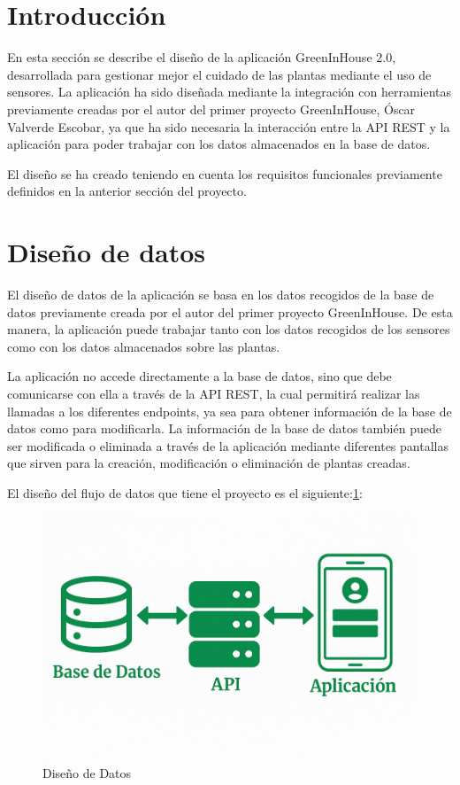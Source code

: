 
\section{Introducción}
En esta sección se describe el diseño de la aplicación GreenInHouse 2.0, desarrollada para gestionar mejor el cuidado de las plantas mediante el uso de sensores.
La aplicación ha sido diseñada mediante la integración con herramientas previamente creadas por el autor del primer proyecto GreenInHouse, Óscar Valverde Escobar, ya que ha sido necesaria la interacción entre la API REST y la aplicación para poder trabajar con los datos almacenados en la base de datos.

El diseño se ha creado teniendo en cuenta los requisitos funcionales previamente definidos en la anterior sección del proyecto.

\section{Diseño de datos}
El diseño de datos de la aplicación se basa en los datos recogidos de la base de datos previamente creada por el autor del primer proyecto GreenInHouse.
De esta manera, la aplicación puede trabajar tanto con los datos recogidos de los sensores como con los datos almacenados sobre las plantas.

La aplicación no accede directamente a la base de datos, sino que debe comunicarse con ella a través de la API REST, la cual permitirá realizar las llamadas a los diferentes endpoints, ya sea para obtener información de la base de datos como para modificarla. La información de la base de datos también puede ser modificada o eliminada a través de la aplicación mediante diferentes pantallas que sirven para la creación, modificación o eliminación de plantas creadas. 

El diseño del flujo de datos que tiene el proyecto es el siguiente:\ref{D1}:
\begin{figure}[H]
    \centering
    \includegraphics[width=0.8\linewidth]{Intercambio_Datos.png}
    \caption{Diseño de Datos}
    \label{D1}
\end{figure}



